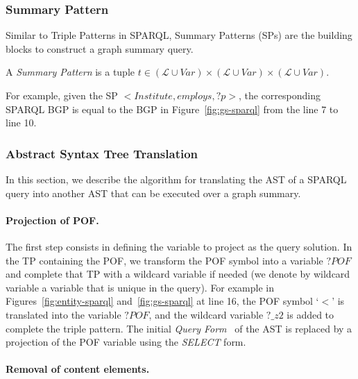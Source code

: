 \subsubsection{Summary Pattern}

Similar to Triple Patterns in SPARQL, Summary Patterns (SPs) are the building blocks to construct a graph summary query.

\begin{definition}
	A \emph{Summary Pattern} is a tuple $t \in  (\mathcal{L} \cup Var) \times (\mathcal{L} \cup Var) \times (\mathcal{L} \cup Var)$.
	\label{def:summary-triple-pattern}
\end{definition}

For example, given the SP \mbox{$<Institute, employs, ?p>$}, the corresponding SPARQL BGP is equal to the BGP in Figure~\ref{fig:gs-sparql} from the line 7 to line 10.

\subsubsection{Abstract Syntax Tree Translation}

In this section, we describe the algorithm for translating the AST of a SPARQL query into another AST that can be executed over a graph summary.

\paragraph{Projection of POF.}

The first step consists in defining the variable to project as the query solution. In the TP containing the POF, we transform the POF symbol into a variable $?POF$ and complete that TP with a wildcard variable if needed (we denote by wildcard variable a variable that is unique in the query). For example in Figures~\ref{fig:entity-sparql} and~\ref{fig:gs-sparql} at line 16, the POF symbol `$<$' is translated into the variable $?POF$, and the wildcard variable $?\_z2$ is added to complete the triple pattern.
The initial \emph{Query Form}~\cite{PrudS08} of the AST is replaced by a projection of the POF variable using the \emph{SELECT} form.

\paragraph{Removal of content elements.}


